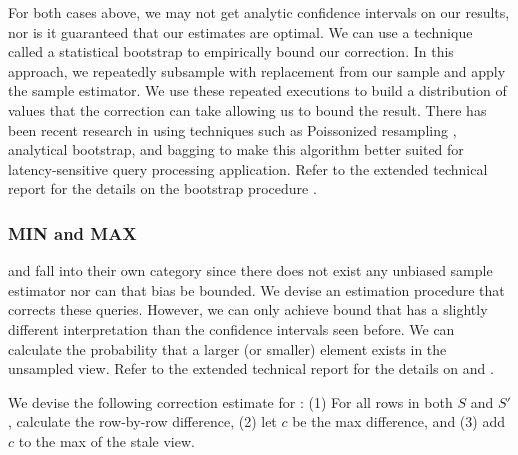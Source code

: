


For both cases above, we may not get analytic confidence intervals on our results, nor is it guaranteed that our estimates are optimal.
We can use a technique called a statistical bootstrap \cite{AgarwalMPMMS13} to empirically bound our correction.
In this approach, we repeatedly subsample with replacement from our sample and apply the sample estimator.
We use these repeated executions to build a distribution of values that the correction can take allowing us to bound the result.
There has been recent research in using techniques such as Poissonized resampling \cite{agarwalknowing}, analytical bootstrap\cite{DBLP:conf/sigmod/ZengGMZ14}, and bagging \cite{DBLP:conf/kdd/KleinerTASJ13} to make this algorithm better suited for latency-sensitive query processing application.
Refer to the extended technical report for the details on the bootstrap procedure \cite{technicalReport}.

\subsubsection{MIN and MAX}
\minfunc and \maxfunc fall into their own category since there does not exist any unbiased sample estimator nor can that bias be bounded.
We devise an estimation procedure that corrects these queries.
However, we can only achieve bound that has a slightly different interpretation than the confidence intervals seen before.
We can calculate the probability that a larger (or smaller) element exists in the unsampled view.
Refer to the extended technical report for the details on \minfunc and \maxfunc \cite{technicalReport}.

\iffalse
We devise the following correction estimate for \maxfunc: (1) For all rows in both $S$ and $S'$, calculate the row-by-row difference, (2) let $c$ be the max difference, and (3) add $c$ to the max of the stale view.

